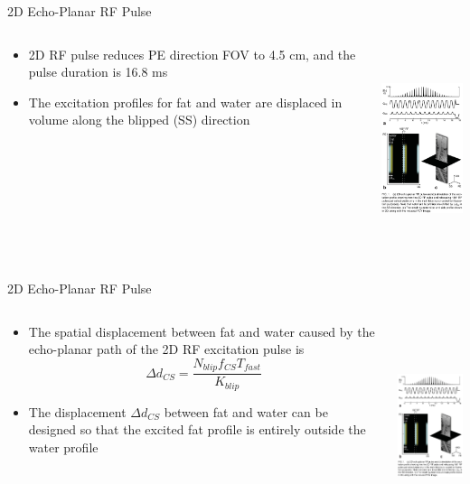 \documentclass{beamer}
\begin{document}
\begin{frame}{2D Echo-Planar RF Pulse}
\begin{columns}[T]
	\begin{column}[T]{5cm}
		\begin{itemize}
			\item 2D RF pulse reduces PE direction FOV to 4.5 cm, and the pulse duration is 16.8 ms
			\item The excitation profiles for fat and water are displaced in volume along the blipped (SS) direction
		\end{itemize}
	\end{column}
	\begin{column}[T]{5cm}
		\includegraphics[height=6cm]{SpineDWIfig1}
	\end{column}
\end{columns}
\end{frame}

\begin{frame}{2D Echo-Planar RF Pulse}
\begin{columns}[T]
	\begin{column}[T]{5cm}
		\begin{itemize}
			\item The spatial displacement between fat and water caused by the echo-planar path of the 2D RF excitation pulse is $$\Delta d_{CS}=\frac{N_{blip}f_{CS}T_{fast}}{K_{blip}}$$
			\item The displacement $\Delta d_{CS}$ between fat and water can be designed so that the excited fat profile is entirely outside the water profile
		\end{itemize}
	\end{column}
	\begin{column}[T]{5cm}
		\includegraphics[height=6cm]{SpineDWIfig1}
	\end{column}
\end{columns}
\end{frame}
\end{document}
